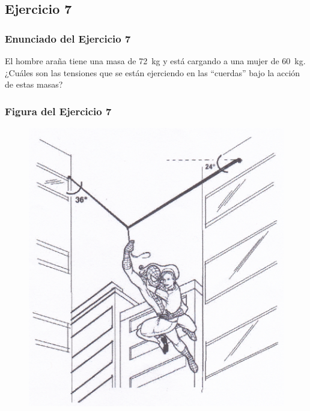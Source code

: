 \documentclass[12pt]{beamer}
\begin{document}
\subsection*{Ejercicio 7}

\begin{frame}
\frametitle{Enunciado del Ejercicio 7}
El hombre araña tiene una masa de \SI{72}{\kilo\gram} y está cargando a una mujer de \SI{60}{\kilo\gram}.
\\
\bigskip
\pause
¿Cuáles son las tensiones que se están ejerciendo en las \enquote{cuerdas} bajo la acción de estas masas?
\end{frame}
\begin{frame}
\frametitle{Figura del Ejercicio 7}
\begin{figure}
  \centering
  \includegraphics[scale=0.81]{Imagenes/DCL_Problema_07.png}
\end{figure}
\end{frame}
\end{document}
